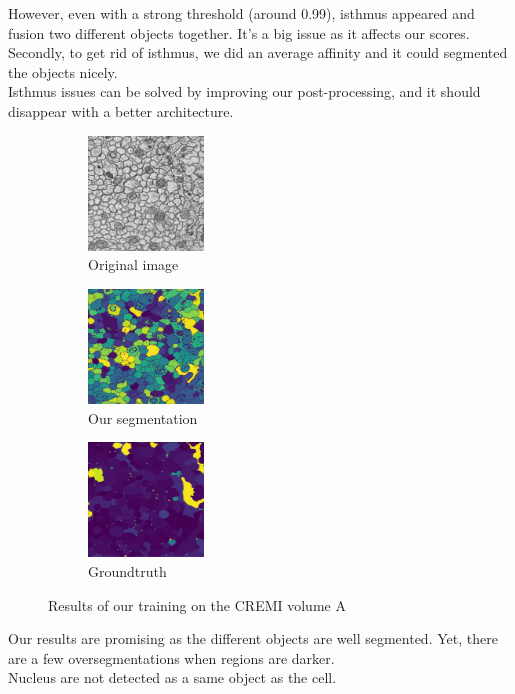 However, even with a strong threshold (around 0.99), isthmus appeared and fusion two different objects together.
It's a big issue as it affects our scores.\\
Secondly, to get rid of isthmus, we did an average affinity and it could segmented the objects nicely.\\
Isthmus issues can be solved by improving our post-processing, and it should disappear with a better architecture.\\

\begin{figure}[!htbp]
    \centering
    \begin{subfigure}[t]{0.31\textwidth}
        \centering
        \includegraphics[height=1.2in]{./images/cremi_orig_1.png}
        \caption{Original image}
    \end{subfigure}%
    \begin{subfigure}[t]{0.31\textwidth}
        \centering
        \includegraphics[height=1.2in]{./images/cremi_out_1.png}
        \caption{Our segmentation}
    \end{subfigure}%
    \begin{subfigure}[t]{0.31\textwidth}
        \centering
        \includegraphics[height=1.2in]{./images/cremi_gt_1.png}
        \caption{Groundtruth}
    \end{subfigure}
    \caption{Results of our training on the CREMI volume A}
\end{figure}

Our results are promising as the different objects are well segmented. 
Yet, there are a few oversegmentations when regions are darker.\\ 
Nucleus are not detected as a same object as the cell.\\

